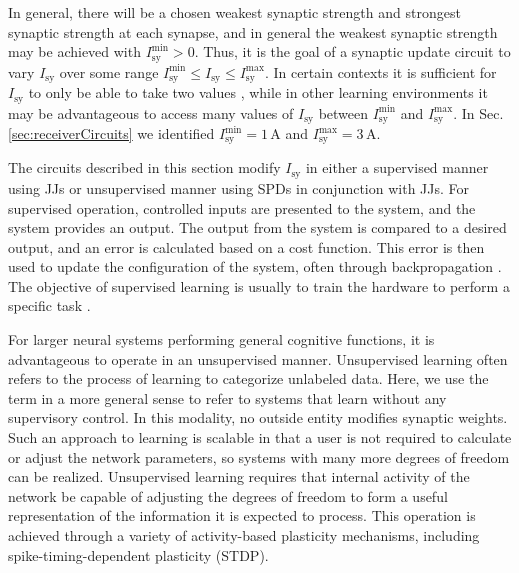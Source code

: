 \documentclass[twocolumn]{article}
\begin{document}
In general, there will be a chosen weakest synaptic strength and strongest synaptic strength at each synapse, and in general the weakest synaptic strength may be achieved with $I_{\mathrm{sy}}^{\mathrm{min}} > 0$. Thus, it is the goal of a synaptic update circuit to vary $I_{\mathrm{sy}}$ over some range $I_{\mathrm{sy}}^{\mathrm{min}}\le I_{\mathrm{sy}} \le I_{\mathrm{sy}}^{\mathrm{max}}$. In certain contexts it is sufficient for $I_{\mathrm{sy}}$ to only be able to take two values  \cite{lide2015}, while in other learning environments it may be advantageous to access many values of $I_{\mathrm{sy}}$ between $I_{\mathrm{sy}}^{\mathrm{min}}$ and $I_{\mathrm{sy}}^{\mathrm{max}}$. In Sec.\,\ref{sec:receiverCircuits} we identified $I_{\mathrm{sy}}^{\mathrm{min}} = 1$\,\textmu A and $I_{\mathrm{sy}}^{\mathrm{max}} = 3$\,\textmu A. 

The circuits described in this section modify $I_{\mathrm{sy}}$ in either a supervised manner using JJs or unsupervised manner using SPDs in conjunction with JJs. For supervised operation, controlled inputs are presented to the system, and the system provides an output. The output from the system is compared to a desired output, and an error is calculated based on a cost function. This error is then used to update the configuration of the system, often through backpropagation \cite{ni2015}. The objective of supervised learning is usually to train the hardware to perform a specific task \cite{sihu2016}. 

For larger neural systems performing general cognitive functions, it is advantageous to operate in an unsupervised manner. Unsupervised learning often refers to the process of learning to categorize unlabeled data. Here, we use the term in a more general sense to refer to systems that learn without any supervisory control. In this modality, no outside entity modifies synaptic weights. Such an approach to learning is scalable in that a user is not required to calculate or adjust the network parameters, so systems with many more degrees of freedom can be realized. Unsupervised learning requires that internal activity of the network be capable of adjusting the degrees of freedom to form a useful representation of the information it is expected to process. This operation is achieved through a variety of activity-based plasticity mechanisms, including spike-timing-dependent plasticity (STDP).
\end{document}
